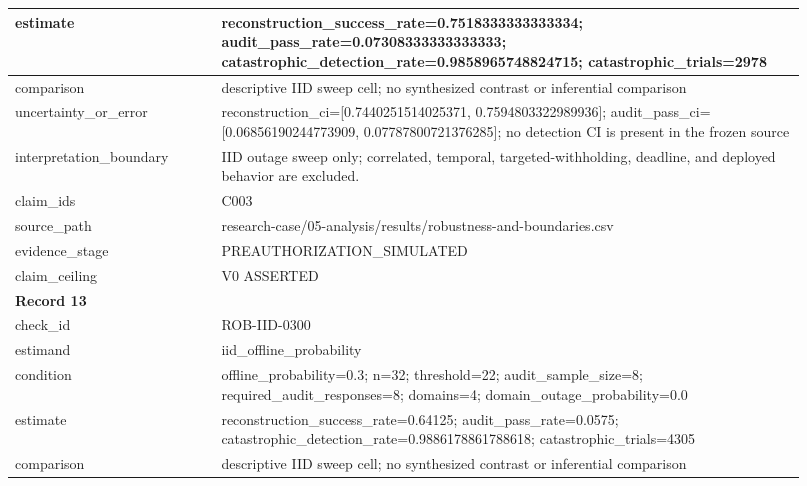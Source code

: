 \begin{longtable}{|p{0.24\linewidth}|p{0.68\linewidth}|}
estimate & reconstruction\_\allowbreak{}success\_\allowbreak{}rate=0.7518333333333334;\allowbreak{} audit\_\allowbreak{}pass\_\allowbreak{}rate=0.07308333333333333;\allowbreak{} catastrophic\_\allowbreak{}detection\_\allowbreak{}rate=0.9858965748824715;\allowbreak{} catastrophic\_\allowbreak{}trials=2978 \\ \hline
comparison & descriptive IID sweep cell;\allowbreak{} no synthesized contrast or inferential comparison \\ \hline
uncertainty\_\allowbreak{}or\_\allowbreak{}error & reconstruction\_\allowbreak{}ci=[0.7440251514025371, 0.7594803322989936];\allowbreak{} audit\_\allowbreak{}pass\_\allowbreak{}ci=[0.06856190244773909, 0.07787800721376285];\allowbreak{} no detection CI is present in the frozen source \\ \hline
interpretation\_\allowbreak{}boundary & IID outage sweep only;\allowbreak{} correlated, temporal, targeted-withholding, deadline, and deployed behavior are excluded. \\ \hline
claim\_\allowbreak{}ids & C003 \\ \hline
source\_\allowbreak{}path & research-case/05-analysis/results/robustness-and-boundaries.csv \\ \hline
evidence\_\allowbreak{}stage & PREAUTHORIZATION\_\allowbreak{}SIMULATED \\ \hline
claim\_\allowbreak{}ceiling & V0 ASSERTED \\ \hline
\multicolumn{2}{|l|}{\textbf{Record 13}} \\ \hline
check\_\allowbreak{}id & ROB-IID-0300 \\ \hline
estimand & iid\_\allowbreak{}offline\_\allowbreak{}probability \\ \hline
condition & offline\_\allowbreak{}probability=0.3;\allowbreak{} n=32;\allowbreak{} threshold=22;\allowbreak{} audit\_\allowbreak{}sample\_\allowbreak{}size=8;\allowbreak{} required\_\allowbreak{}audit\_\allowbreak{}responses=8;\allowbreak{} domains=4;\allowbreak{} domain\_\allowbreak{}outage\_\allowbreak{}probability=0.0 \\ \hline
estimate & reconstruction\_\allowbreak{}success\_\allowbreak{}rate=0.64125;\allowbreak{} audit\_\allowbreak{}pass\_\allowbreak{}rate=0.0575;\allowbreak{} catastrophic\_\allowbreak{}detection\_\allowbreak{}rate=0.9886178861788618;\allowbreak{} catastrophic\_\allowbreak{}trials=4305 \\ \hline
comparison & descriptive IID sweep cell;\allowbreak{} no synthesized contrast or inferential comparison \\ \hline

\end{longtable}
